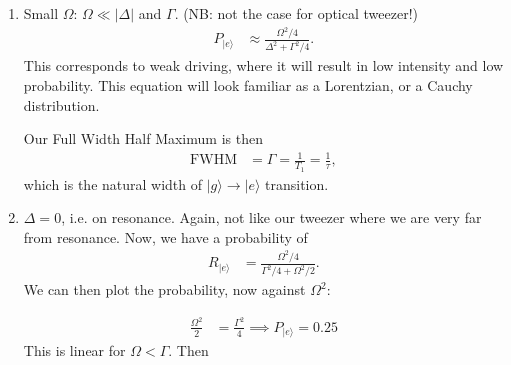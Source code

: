 \documentclass[lasers.tex]{subfiles}
\begin{document}
\begin{enumerate}
    \item Small $\Omega$: $\Omega\ll|\Delta|$ and $\Gamma$. (NB: not the case for optical tweezer!) 
        \begin{align}
            P_{|e\rangle} &\approx \frac{\Omega^2/4}{\Delta^2 + \Gamma^2/4}.
        \end{align}
        This corresponds to weak driving, where it will result in low intensity and low probability.
        This equation will look familiar as a Lorentzian, or a Cauchy distribution. 
        \begin{figure}[H]
            \centering
        \end{figure}
        Our Full Width Half Maximum is then
        \begin{align}
            \text{FWHM} &= \Gamma = \frac{1}{T_1}=\frac{1}{\tau},
        \end{align}
        which is the natural width of $|g\rangle\to|e\rangle$ transition.
    \item $\Delta=0$, i.e. on resonance. 
        Again, not like our tweezer where we are very far from resonance. 
        Now, we have a probability of
        \begin{align}
            R_{|e\rangle} &= \frac{\Omega^2/4}{\Gamma^2/4 + \Omega^2/2}.
        \end{align}
        We can then plot the probability, now against $\Omega^2$:
        \begin{figure}[H]
            \centering
        \end{figure}
        \begin{align}
            \frac{\Omega^2}{2} &= \frac{\Gamma^2}{4} \implies P_{|e\rangle} = 0.25
        \end{align}
        This is linear for $\Omega<\Gamma$.
        Then

\end{enumerate}
\end{document}
